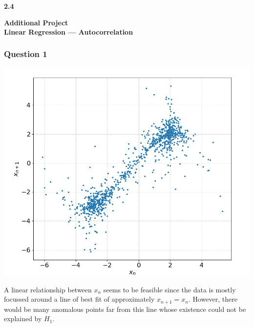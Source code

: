 \documentclass[12pt, a4paper]{article}
\begin{document}
	
\setlength{\parindent}{0pt}
\captionsetup{justification=centering}
\lstset{
	showstringspaces=false
}


\begin{titlepage}
	\LARGE
	\textbf{2.4}
	\begin{center}
		\vspace*{7cm}
		
		\LARGE
		\textbf{Additional Project \\ Linear Regression — Autocorrelation}
		
		\vspace{0.5cm}
	\end{center}
\end{titlepage}


\subsubsection*{Question 1}

\begin{minipage}{\textwidth}
	\includegraphics[width=\linewidth]{q1_fig1}
	\label{q1_fig1}
\end{minipage}
\vspace{0.2cm}

A linear relationship between $x_{n}$ seems to be feasible since the data is mostly focussed around a line of best fit of approximately $x_{n+1} = x_{n}$. However, there would be many anomalous points far from this line whose existence could not be explained by $H_{1}$. 
\end{document}
